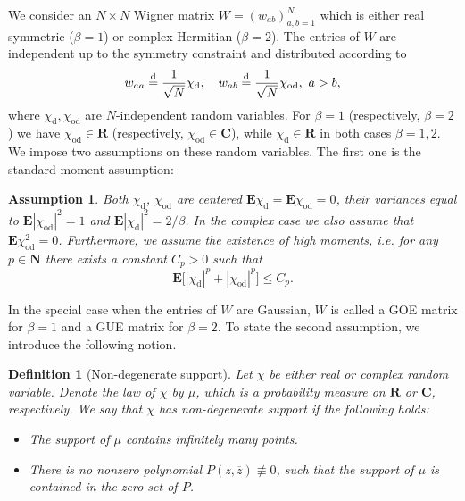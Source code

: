 \documentclass[10pt]{amsart}
\newtheorem{definition}[theorem]{Definition}
\newtheorem{assumption}[theorem]{Assumption}
\numberwithin{equation}{section}
\newcommand{\dif}{\mathrm{d}}
\newcommand{\E}{\mathbf{E}}
\newcommand{\R}{\mathbf{R}}
\newcommand{\C}{\mathbf{C}}
\newcommand{\N}{\mathbf{N}}
\newcommand{\rd}{\mathrm{d}}
\begin{document}
We consider an $N\times N$ Wigner matrix $W=\left(w_{ab}\right)_{a,b=1}^N$ which is either real symmetric ($\beta=1$) or complex Hermitian ($\beta=2$). The entries of $W$ are independent up to the symmetry constraint and distributed according to
\begin{equation*}
w_{aa}\stackrel{\rd}{=}\frac{1}{\sqrt{N}}\chi_{\rm{d}},\quad w_{ab}\stackrel{\rd}{=}\frac{1}{\sqrt{N}}\chi_{\rm{od}},\,\, a>b,
\end{equation*}
where $\chi_\dif, \chi_{\mathrm{od}}$ are $N$-independent random variables. For $\beta=1$ (respectively, $\beta=2$) we have $\chi_{\mathrm{od}}\in\R$ (respectively, $\chi_{\mathrm{od}}\in\C$), while $\chi_\dif\in\R$ in both cases $\beta=1,2$. We impose two assumptions on these random variables. The first one is the standard moment assumption:
\begin{assumption}
\label{ass:momass}
Both $\chi_\dif$, $\chi_{\mathrm{od}}$ are centered $\E\chi_\dif=\E \chi_{\mathrm{od}}=0$, their variances equal to $\E|\chi_{\mathrm{od}}|^2=1$ and $\E|\chi_{\mathrm{d}}|^2=2/\beta$. In the complex case we also assume that $\E\chi_{\mathrm{od}}^2=0$. Furthermore, we assume the existence of high moments, i.e. for any $p\in\N$ there exists a constant $C_p>0$ such that
\begin{equation}
\label{eq:momass}
\E\big[|\chi_\dif|^p+|\chi_{\mathrm{od}}|^p\big]\le C_p.
\end{equation}
\end{assumption} 

In the special case when the entries of $W$ are Gaussian, $W$ is called a GOE matrix for $\beta=1$ and a GUE matrix for $\beta=2$. To state the second assumption, we introduce the following notion.

\begin{definition}[Non-degenerate support]\label{def:support} Let $\chi$ be either real or complex random variable. Denote the law of $\chi$ by $\mu$, which is a probability measure on $\R$ or $\C$, respectively. We say that $\chi$ has non-degenerate support if the following holds:
\begin{itemize}
\item[$\bullet$]  [Real case] The support of $\mu$ contains infinitely many points.
\item[$\bullet$]   [Complex case] There is no nonzero polynomial $P(z,\overline{z})\not\equiv 0$, such that the support of $\mu$ is contained in the zero set of $P$.
\end{itemize}
\end{definition}
\end{document}
